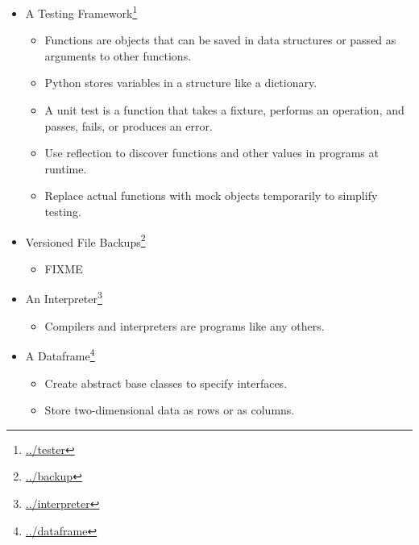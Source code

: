 \documentclass{scrbook}
\newcommand{\hreffoot}[2]{{#1}\footnote{\href{#2}{#2}}}
\begin{document}
\begin{itemize}

\item \hreffoot{A Testing Framework}{../tester}
\begin{itemize}

\item Functions are objects that can be saved in data structures or passed as arguments to other functions.

\item Python stores variables in a structure like a dictionary.

\item A unit test is a function that takes a fixture, performs an operation, and passes, fails, or produces an error.

\item Use reflection to discover functions and other values in programs at runtime.

\item Replace actual functions with mock objects temporarily to simplify testing.

\end{itemize}



\item \hreffoot{Versioned File Backups}{../backup}
\begin{itemize}

\item FIXME

\end{itemize}



\item \hreffoot{An Interpreter}{../interpreter}
\begin{itemize}

\item Compilers and interpreters are programs like any others.

\end{itemize}



\item \hreffoot{A Dataframe}{../dataframe}
\begin{itemize}

\item Create abstract base classes to specify interfaces.

\item Store two-dimensional data as rows or as columns.


\end{itemize}
\end{itemize}
\end{document}
